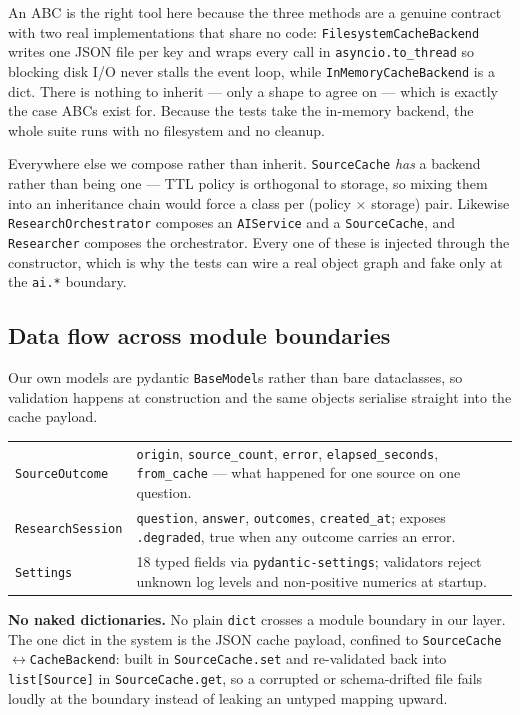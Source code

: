 \documentclass[11pt,a4paper]{article}
\begin{document}
An ABC is the right tool here because the three methods are a genuine contract with two real
implementations that share no code: \texttt{FilesystemCacheBackend} writes one JSON file per key and
wraps every call in \texttt{asyncio.to\_thread} so blocking disk I/O never stalls the event loop,
while \texttt{InMemoryCacheBackend} is a dict. There is nothing to inherit --- only a shape to agree
on --- which is exactly the case ABCs exist for. Because the tests take the in-memory backend, the
whole suite runs with no filesystem and no cleanup.

Everywhere else we compose rather than inherit. \texttt{SourceCache} \emph{has} a backend rather
than being one --- TTL policy is orthogonal to storage, so mixing them into an inheritance chain
would force a class per (policy $\times$ storage) pair. Likewise \texttt{ResearchOrchestrator}
composes an \texttt{AIService} and a \texttt{SourceCache}, and \texttt{Researcher} composes the
orchestrator. Every one of these is injected through the constructor, which is why the tests can
wire a real object graph and fake only at the \texttt{ai.*} boundary.

\subsection{Data flow across module boundaries}

Our own models are pydantic \texttt{BaseModel}s rather than bare dataclasses, so validation happens
at construction and the same objects serialise straight into the cache payload.

\begin{tabularx}{\textwidth}{@{}lX@{}}
\toprule
\texttt{SourceOutcome} & \texttt{origin}, \texttt{source\_count}, \texttt{error},
\texttt{elapsed\_seconds}, \texttt{from\_cache} --- what happened for one source on one question. \\
\addlinespace
\texttt{ResearchSession} & \texttt{question}, \texttt{answer}, \texttt{outcomes},
\texttt{created\_at}; exposes \texttt{.degraded}, true when any outcome carries an error. \\
\addlinespace
\texttt{Settings} & 18 typed fields via \texttt{pydantic-settings}; validators reject unknown log
levels and non-positive numerics at startup. \\
\bottomrule
\end{tabularx}

\vspace{0.5em}
\begin{deliverbox}
\textbf{No naked dictionaries.} No plain \texttt{dict} crosses a module boundary in our layer. The
one dict in the system is the JSON cache payload, confined to
\texttt{SourceCache}$\leftrightarrow$\texttt{CacheBackend}: built in \texttt{SourceCache.set} and
re-validated back into \texttt{list[Source]} in \texttt{SourceCache.get}, so a corrupted or
schema-drifted file fails loudly at the boundary instead of leaking an untyped mapping upward.
\end{deliverbox}
\end{document}
